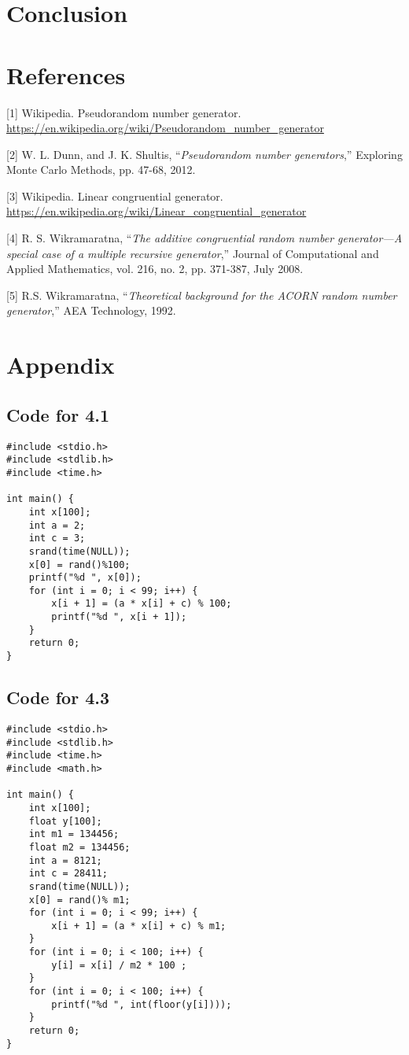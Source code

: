 \documentclass[a4paper]{article}
\begin{document}
\section{Conclusion}

\section{References}
	[1] Wikipedia. Pseudorandom number generator. \url{https://en.wikipedia.org/wiki/Pseudorandom_number_generator}

	[2] W. L. Dunn, and J. K. Shultis, “\textit{Pseudorandom number generators},” Exploring Monte Carlo Methods, pp. 47-68, 2012.

	[3] Wikipedia. Linear congruential generator. \url{https://en.wikipedia.org/wiki/Linear_congruential_generator}

	[4] R. S. Wikramaratna, “\textit{The additive congruential random number generator—A special case of a multiple recursive generator},” Journal of Computational and Applied Mathematics, vol. 216, no. 2, pp. 371-387, July 2008.

	[5] R.S. Wikramaratna, “\textit{Theoretical background for the ACORN random number generator},” AEA Technology, 1992.

\newpage

\section{Appendix}

	\subsection{Code for 4.1}

	\lstset{language=C}
\begin{lstlisting}
#include <stdio.h>
#include <stdlib.h>
#include <time.h>

int main() {
	int x[100];
	int a = 2;
	int c = 3;
	srand(time(NULL));
	x[0] = rand()%100;
	printf("%d ", x[0]);
	for (int i = 0; i < 99; i++) {
		x[i + 1] = (a * x[i] + c) % 100;
		printf("%d ", x[i + 1]);
	}
	return 0;
}
\end{lstlisting}

	\subsection{Code for 4.3}

\lstset{language=C}
\begin{lstlisting}
#include <stdio.h>
#include <stdlib.h>
#include <time.h>
#include <math.h>

int main() {
	int x[100];
	float y[100];
	int m1 = 134456;
	float m2 = 134456;
	int a = 8121;
	int c = 28411;
	srand(time(NULL));
	x[0] = rand()% m1;
	for (int i = 0; i < 99; i++) {
		x[i + 1] = (a * x[i] + c) % m1;
	}
	for (int i = 0; i < 100; i++) {
		y[i] = x[i] / m2 * 100 ;
	}
	for (int i = 0; i < 100; i++) {
		printf("%d ", int(floor(y[i])));
	}
	return 0;
}
\end{lstlisting}
\end{document}
